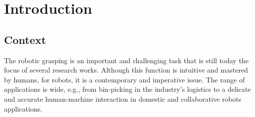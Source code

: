 \chapter{Introduction}
\label{Ch:Introducao}

\section{Context}

\sloppy %
The robotic grasping is an important and challenging task that is still today the focus of several research works. Although this function is intuitive and mastered by humans, for robots, it is a contemporary and imperative issue. The range of applications is wide, e.g., from bin-picking in the industry's logistics to a delicate and accurate human-machine interaction in domestic and collaborative robots applications.


